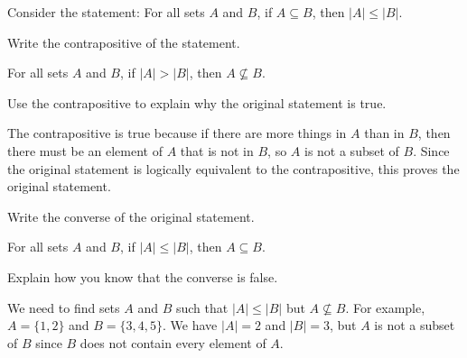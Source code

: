 \documentclass[12pt]{exam}
\def\gt{>}
\begin{document}

Consider the statement: For all sets $A$ and $B$, if $A \subseteq B$, then $|A| \le |B|$.
\begin{questions}
\question Write the contrapositive of the statement.
\begin{solution}
  For all sets $A$ and $B$, if $|A| \gt |B|$, then $A \not\subseteq B$.
\end{solution}
\vfill

\question Use the contrapositive to explain why the original statement is true.
\begin{solution}
  The contrapositive is true because if there are more things in $A$ than in $B$, then there must be an element of $A$ that is not in $B$, so $A$ is not a subset of $B$.  Since the original statement is logically equivalent to the contrapositive, this proves the original statement.
\end{solution}
\vfill

\question Write the converse of the original statement.
\begin{solution}
  For all sets $A$ and $B$, if $|A| \le |B|$, then $A \subseteq B$.
\end{solution}
\vfill

\question Explain how you know that the converse is false.
\begin{solution}
  We need to find sets $A$ and $B$ such that $|A| \le |B|$ but $A \not\subseteq B$.  For example, $A = \{1,2\}$ and $B = \{3,4,5\}$.  We have $|A| = 2$ and $|B| = 3$, but $A$ is not a subset of $B$ since $B$ does not contain every element of $A$.
\end{solution}

\vfill



\end{questions}
\end{document}
